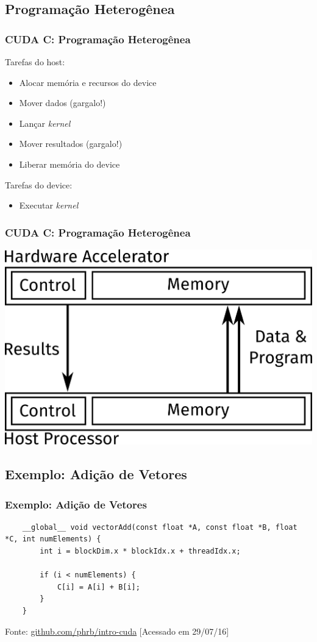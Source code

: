 \documentclass[10pt, compress]{beamer}
\begin{document}
\subsection{Programação Heterogênea}

\begin{frame}
    \frametitle{CUDA C: Programação Heterogênea}
    Tarefas do \alert{host}:
    \begin{itemize}
        \item Alocar memória e recursos do \alert{device}
        \item Mover \alert{dados} (\alert{gargalo!})
            \pause
        \item Lançar \textit{kernel}
            \pause
        \item Mover \alert{resultados} (\alert{gargalo!})
        \item Liberar memória do \alert{device}
    \end{itemize}
    \pause
    Tarefas do \alert{device}:
    \begin{itemize}
        \item Executar \textit{kernel}
    \end{itemize}
\end{frame}

\begin{frame}
    \frametitle{CUDA C: Programação Heterogênea}
    \centering
    \includegraphics[width=.8\textwidth]{accel}
\end{frame}

\subsection{Exemplo: Adição de Vetores}

\begin{frame}[fragile]
    \frametitle{Exemplo: Adição de Vetores}
    \begin{lstlisting}
    __global__ void vectorAdd(const float *A, const float *B, float *C, int numElements) {
        int i = blockDim.x * blockIdx.x + threadIdx.x;

        if (i < numElements) {
            C[i] = A[i] + B[i];
        }
    }
    \end{lstlisting}

    \vfill

    \begin{center}
        \tiny{Fonte: \url{github.com/phrb/intro-cuda} [Acessado em 29/07/16]}
    \end{center}
\end{frame}
\end{document}
